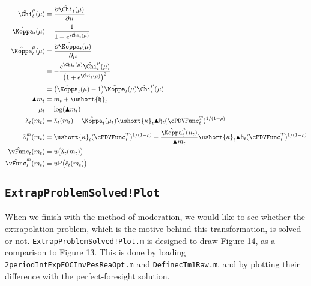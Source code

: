 \documentclass[titlepage,abstract]{\econtex}
\providecommand{\vInv}{\ensuremath{\scriptstyle \Lambda \displaystyle}}
\begin{document}
\begin{itemize}
            \begin{equation}\begin{gathered}\begin{aligned}
            \hat{\Chi}^{\mu}_{t}(\mu)  & =  \frac{\partial \hat{\Chi}_{t}(\mu)}{\partial \mu} \\
            \hat{\Koppa}_{t} (\mu)  & =  \frac{1}{1+e^{\hat{\Chi}_{t}(\mu)}} \\
            \hat{\Koppa}^{\mu}_{t} (\mu)  & =  \frac{\partial \hat{\Koppa}_{t} (\mu)}{\partial \mu} \\
             & =  -\frac{e^{\hat{\Chi}_{t}(\mu)} \hat{\Chi}^{\mu}_{t}(\mu)}{\big(1+e^{\hat{\Chi}_{t}(\mu)}\big)^{2}} \\
             & =  \big(\hat{\Koppa}_{t} (\mu)-1\big)\hat{\Koppa}_{t} (\mu) \hat{\Chi}^{\mu}_{t}(\mu) \\
            \blacktriangle m_{t}  & =  m_{t} + \ushort{\mathfrak{h}}_{t} \\
            \mu_{t}  & =  \log(\blacktriangle m_{t}) \\
            \hat{\vInv}_{t} (m_{t})  & =  \bar{\vInv}_{t}(m_{t})-\hat{\Koppa}_{t} (\mu_{t}) \ushort{\kappa}_{t} \blacktriangle \mathfrak{h}_{t} (\cPDVFunc_{t}^{T})^{1/(1-\rho)} \\
            \hat{\vInv}_{t}^{m} (m_{t})  & =  \ushort{\kappa}_{t} (\cPDVFunc_{t}^{T})^{1/(1-\rho)}-\frac{\hat{\Koppa}_{t}^{\mu}(\mu_{t})}{\blacktriangle m_{t}} \ushort{\kappa}_{t} \blacktriangle \mathfrak{h}_{t} (\cPDVFunc_{t}^{T})^{1/(1-\rho)} \\
            \hat{\vFunc}_{t} (m_{t})  & =  u\big(\hat{\vInv}_{t}(m_{t})\big) \\
            \hat{\vFunc}_{t}^{m} (m_{t})  & =  u\text{P}\big(\hat{c}_{t}(m_{t})\big)
            \end{aligned}\end{gathered}\end{equation}
\end{itemize}

\subsection{\texttt{ExtrapProblemSolved!Plot}}

When we finish with the method of moderation, we would like to see whether the extrapolation problem, which is the motive behind this transformation, is solved or not. \texttt{ExtrapProblemSolved!Plot.m} is designed to draw Figure 14, as a comparison to Figure 13. This is done by loading \texttt{2periodIntExpFOCInvPesReaOpt.m} and \texttt{DefinecTm1Raw.m}, and by plotting their difference with the perfect-foresight solution.
\end{document}
